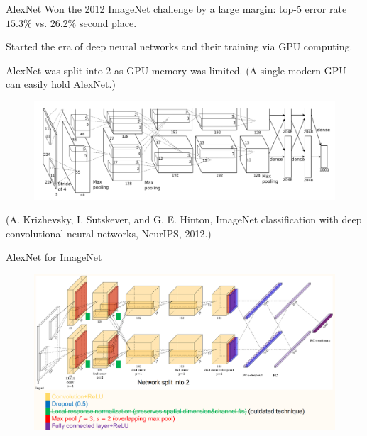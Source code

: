 \begin{frame}[allowframebreaks]

\begin{mydefinitionblock}{7.4}{AlexNet}
    Won the 2012 ImageNet challenge by a large margin: top-5 error rate $15.3 \%$ vs. $26.2 \%$ second place.

    Started the era of deep neural networks and their training via GPU computing.

    AlexNet was split into 2 as GPU memory was limited. (A single modern GPU can easily hold AlexNet.)

    \begin{figure}[H]
        \centering
        \includegraphics[width=1.0\textwidth]{.././assets/7.4.png}
    \end{figure}

    (A. Krizhevsky, I. Sutskever, and G. E. Hinton, ImageNet classification with deep convolutional neural networks, NeurIPS, 2012.)
\end{mydefinitionblock}

\end{frame}

\begin{frame}[allowframebreaks]

\begin{mydefinitionblock}{7.5}{AlexNet for ImageNet}
    \begin{figure}[H]
        \centering
        \includegraphics[width=1.0\textwidth]{.././assets/7.5.png}
    \end{figure}
\end{mydefinitionblock}

\end{frame}

